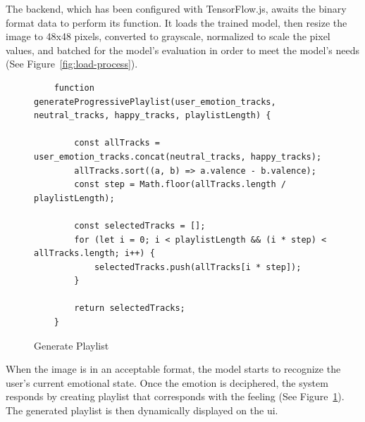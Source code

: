 The backend, which has been configured with TensorFlow.js, awaits the binary format data to perform its function.
It loads the trained model, then resize the image to 48x48 pixels, converted to grayscale, normalized to scale the pixel values, and batched for the model's evaluation in order to meet the model's needs (See Figure~\ref{fig:load-process}).
\\
\begin{figure}[H] 
    \centering
\begin{verbatim}
    function generateProgressivePlaylist(user_emotion_tracks, neutral_tracks, happy_tracks, playlistLength) {

        const allTracks = user_emotion_tracks.concat(neutral_tracks, happy_tracks);
        allTracks.sort((a, b) => a.valence - b.valence);
        const step = Math.floor(allTracks.length / playlistLength);

        const selectedTracks = [];
        for (let i = 0; i < playlistLength && (i * step) < allTracks.length; i++) {
            selectedTracks.push(allTracks[i * step]);
        }

        return selectedTracks;
    }
\end{verbatim}
    \caption{Generate Playlist}
    \label{fig:generate-playlist}
\end{figure}
\indent When the image is in an acceptable format, the model starts to recognize the user's current emotional state.
Once the emotion is deciphered, the system responds by creating playlist that corresponds with the feeling (See Figure~\ref{fig:generate-playlist}).
The generated playlist is then dynamically displayed on the \gls{ui}.
